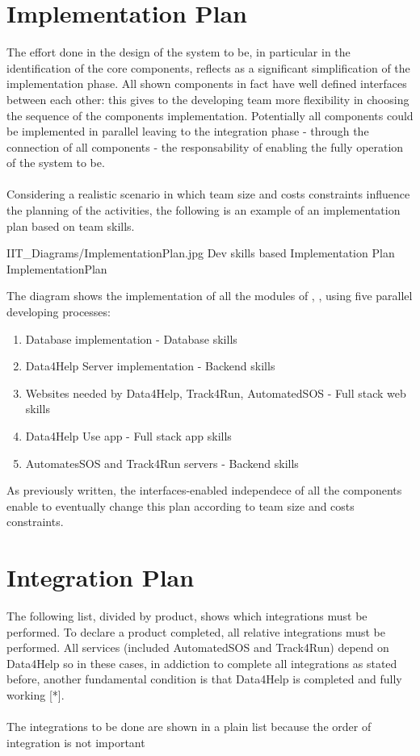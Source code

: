 \documentclass[../DD.tex]{subfiles}
\begin{document}
	\section{Implementation Plan}
		The effort done in the design of the system to be, in particular in the identification of the core components, reflects as a significant simplification of the implementation phase. All shown components in fact have well defined interfaces between each other: this gives to the developing team more flexibility in choosing the sequence of the components implementation. Potentially all components could be implemented in parallel leaving to the integration phase - through the connection of all components - the responsability of enabling the fully operation of the system to be. \\ \\
		Considering a realistic scenario in which team size and costs constraints influence the planning of the activities, the following is an example of an implementation plan based on team skills.
		
		\image {13cm} {IIT_Diagrams/ImplementationPlan.jpg} {Dev skills based Implementation Plan} {ImplementationPlan}

		The diagram shows the implementation of all the modules of , ,  using five parallel developing processes:
\begin{enumerate}
	\item Database implementation - Database skills
	\item Data4Help Server implementation - Backend skills
	\item Websites needed by Data4Help, Track4Run, AutomatedSOS - Full stack web skills
	\item Data4Help Use app - Full stack app skills
	\item AutomatesSOS and Track4Run servers - Backend skills
\end{enumerate}
As previously written, the interfaces-enabled independece of all the components enable to eventually change this plan according to team size and costs constraints.

	\section{Integration Plan}
		The following list, divided by product, shows which integrations must be performed. To declare a product completed, all relative integrations must be performed. All services (included AutomatedSOS and Track4Run) depend on Data4Help so in these cases, in addiction to complete all integrations as stated before, another fundamental condition is that Data4Help is completed and fully working [*].\\ \\
		The integrations to be done are shown in a plain list because the order of integration is not important
\end{document}

